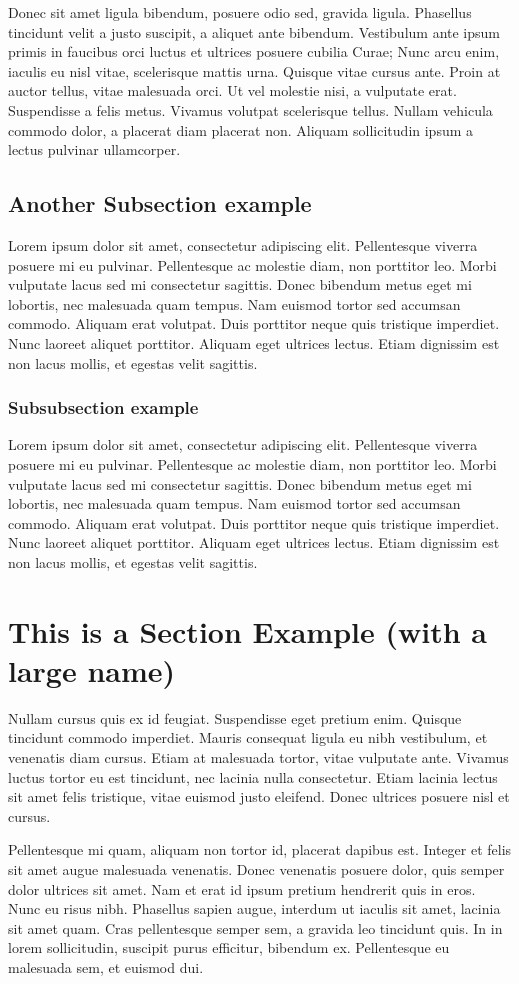 \documentclass{arcanum}
\begin{document}
Donec sit amet ligula bibendum, posuere odio sed, gravida ligula. Phasellus tincidunt
velit a justo suscipit, a aliquet ante bibendum. Vestibulum ante ipsum primis in
faucibus orci luctus et ultrices posuere cubilia Curae; Nunc arcu enim, iaculis
eu nisl vitae, scelerisque mattis urna. Quisque vitae cursus ante. Proin at auctor
tellus, vitae malesuada orci. Ut vel molestie nisi, a vulputate erat. Suspendisse a
felis metus. Vivamus volutpat scelerisque tellus. Nullam vehicula commodo dolor,
a placerat diam placerat non. Aliquam sollicitudin ipsum a lectus pulvinar ullamcorper.

\subsection{Another Subsection example}
Lorem ipsum dolor sit amet, consectetur adipiscing elit. Pellentesque viverra
posuere mi eu pulvinar. Pellentesque ac molestie diam, non porttitor leo. Morbi
vulputate lacus sed mi consectetur sagittis. Donec bibendum metus eget mi lobortis,
nec malesuada quam tempus. Nam euismod tortor sed accumsan commodo. Aliquam erat
volutpat. Duis porttitor neque quis tristique imperdiet. Nunc laoreet aliquet
porttitor. Aliquam eget ultrices lectus. Etiam dignissim est non lacus mollis,
et egestas velit sagittis.

\subsubsection{Subsubsection example}
Lorem ipsum dolor sit amet, consectetur adipiscing elit. Pellentesque viverra
posuere mi eu pulvinar. Pellentesque ac molestie diam, non porttitor leo. Morbi
vulputate lacus sed mi consectetur sagittis. Donec bibendum metus eget mi lobortis,
nec malesuada quam tempus. Nam euismod tortor sed accumsan commodo. Aliquam erat
volutpat. Duis porttitor neque quis tristique imperdiet. Nunc laoreet aliquet
porttitor. Aliquam eget ultrices lectus. Etiam dignissim est non lacus mollis,
et egestas velit sagittis.

\section{This is a Section Example (with a large name)}
Nullam cursus quis ex id feugiat. Suspendisse eget pretium enim. Quisque
tincidunt commodo imperdiet. Mauris consequat ligula eu nibh vestibulum,
et venenatis diam cursus. Etiam at malesuada tortor, vitae vulputate ante.
Vivamus luctus tortor eu est tincidunt, nec lacinia nulla consectetur. Etiam
lacinia lectus sit amet felis tristique, vitae euismod justo eleifend. Donec
ultrices posuere nisl et cursus.

Pellentesque mi quam, aliquam non tortor id, placerat dapibus est. Integer et
felis sit amet augue malesuada venenatis. Donec venenatis posuere dolor, quis
semper dolor ultrices sit amet. Nam et erat id ipsum pretium hendrerit quis in
eros. Nunc eu risus nibh. Phasellus sapien augue, interdum ut iaculis sit amet,
lacinia sit amet quam. Cras pellentesque semper sem, a gravida leo tincidunt
quis. In in lorem sollicitudin, suscipit purus efficitur, bibendum ex.
Pellentesque eu malesuada sem, et euismod dui.
\end{document}
